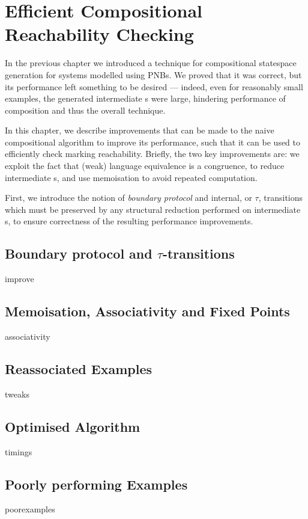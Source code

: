\chapter{Efficient Compositional Reachability Checking}\label{chp:improveEfficiency}

In the previous chapter we introduced a technique for compositional statespace
generation for systems modelled using PNBs. We proved that it was correct, but
its performance left something to be desired --- indeed, even for reasonably
small examples, the generated intermediate \TNFA{}s were large, hindering
performance of \TNFA{} composition and thus the overall technique.

In this chapter, we describe improvements that can be made to the naive
compositional algorithm to improve its performance, such that it can be used to
efficiently check marking reachability. Briefly, the two key improvements are:
we exploit the fact that (weak) language equivalence is a congruence, to reduce
intermediate \TNFA{}s, and use memoisation to avoid repeated computation.

First, we introduce the notion of \emph{boundary protocol} and internal, or
$\tau$, transitions which must be preserved by any structural reduction
performed on intermediate \TNFA{}s, to ensure correctness of the resulting
performance improvements.

\section{Boundary protocol and $\tau$-transitions} \label{sec:boundaryProtocol}
{improve}

\section{Memoisation, Associativity and Fixed Points}\label{sec:memoisation}
{associativity}

\section{Reassociated Examples}\label{sec:reassociation}
{tweaks}

\section{Optimised Algorithm}
{timings}

\section{Poorly performing Examples}
{poorexamples}

